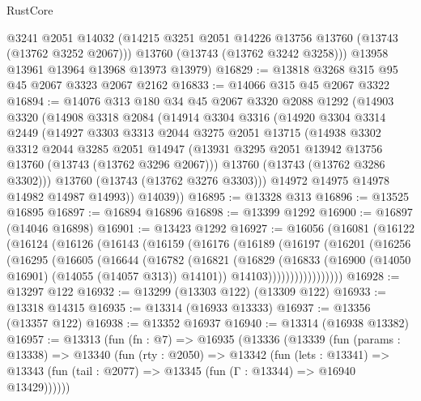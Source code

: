 \begin{lexlean}{RustCore}
\begin{coremodule}
        @3241
        @2051
        @14032
        (@14215 @3251 @2051 @14226 @13756 @13760 (@13743 (@13762 @3252 @2067)))
        @13760
        (@13743 (@13762 @3242 @3258)))
      @13958
      @13961
      @13964
      @13968
      @13973
      @13979)
@16829 := @13818 @3268 @315 @95 @45 @2067 @3323 @2067 @2162
@16833 := @14066 @315 @45 @2067 @3322
@16894 := @14076
    @313
    @180
    @34
    @45
    @2067
    @3320
    @2088
    @1292
    (@14903
      @3320
      (@14908
        @3318
        @2084
        (@14914
          @3304
          @3316
          (@14920
            @3304
            @3314
            @2449
            (@14927
              @3303
              @3313
              @2044
              @3275
              @2051
              @13715
              (@14938
                @3302
                @3312
                @2044
                @3285
                @2051
                @14947
                (@13931 @3295 @2051 @13942 @13756 @13760 (@13743 (@13762 @3296 @2067)))
                @13760
                (@13743 (@13762 @3286 @3302)))
              @13760
              (@13743 (@13762 @3276 @3303)))
            @14972
            @14975
            @14978
            @14982
            @14987
            @14993))
        @14039))
@16895 := @13328 @313
@16896 := @13525 @16895
@16897 := @16894 @16896
@16898 := @13399 @1292
@16900 := @16897 (@14046 @16898)
@16901 := @13423 @1292
@16927 := @16056
    (@16081
      (@16122
        (@16124
          (@16126
            (@16143
              (@16159
                (@16176
                  (@16189
                    (@16197
                      (@16201
                        (@16256
                          (@16295
                            (@16605
                              (@16644
                                (@16782
                                  (@16821
                                    (@16829
                                      (@16833
                                        (@16900 (@14050 @16901) (@14055 (@14057 @313)) @14101))
                                      @14103)))))))))))))))))
@16928 := @13297 @122
@16932 := @13299 (@13303 @122) (@13309 @122)
@16933 := @13318 @14315
@16935 := @13314 (@16933 @13333)
@16937 := @13356 (@13357 @122)
@16938 := @13352 @16937
@16940 := @13314 (@16938 @13382)
@16957 := @13313
    (fun (fn : @7) =>
    @16935
      (@13336
        (@13339
          (fun (params : @13338) =>
          @13340
            (fun (rty : @2050) =>
            @13342
              (fun (lets : @13341) =>
              @13343 (fun (tail : @2077) => @13345 (fun (Γ : @13344) => @16940 @13429))))))

\end{coremodule}
\end{lexlean}
